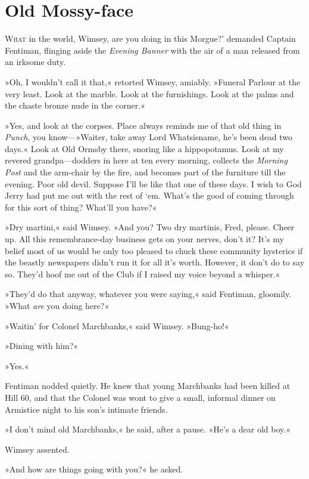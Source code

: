 \chapter{Old Mossy-face}
\lettrine[lines=4,ante=‘]{W}{hat} in the world, Wimsey, are you doing in this  Morgue?' demanded Captain Fentiman, flinging aside the \textit{Evening Banner} with the air of a man released from an irksome duty.

\zz
»Oh, I wouldn't call it that,« retorted Wimsey, amiably. »Funeral Parlour at the very least. Look at the marble. Look at the furnishings. Look at the palms and the chaste bronze nude in the corner.«

»Yes, and look at the corpses. Place always reminds me of that old thing in \textit{Punch}, you know—»Waiter, take away Lord Whatsisname, he's been dead two days.« Look at Old Ormsby there, snoring like a hippopotamus. Look at my revered grandpa—dodders in here at ten every morning, collects the \textit{Morning Post} and the arm-chair by the fire, and becomes part of the furniture till the evening. Poor old devil. Suppose I'll be like that one of these days. I wish to God Jerry had put me out with the rest of `em. What's the good of coming through for this sort of thing? What'll you have?«

»Dry martini,« said Wimsey. »And you? Two dry martinis, Fred, please. Cheer up. All this remembrance-day business gets on your nerves, don't it? It's my belief most of us would be only too pleased to chuck these community hysterics if the beastly newspapers didn't run it for all it's worth. However, it don't do to say so. They'd hoof me out of the Club if I raised my voice beyond a whisper.«

»They'd do that anyway, whatever you were saying,« said Fentiman, gloomily. »What \textit{are} you doing here?«

»Waitin' for Colonel Marchbanks,« said Wimsey. »Bung-ho!«

»Dining with him?«

»Yes.«

Fentiman nodded quietly. He knew that young Marchbanks had been killed at Hill 60, and that the Colonel was wont to give a small, informal dinner on Armistice night to his son's intimate friends.

»I don't mind old Marchbanks,« he said, after a pause. »He's a dear old boy.«

Wimsey assented.

»And how are things going with you?« he asked.

